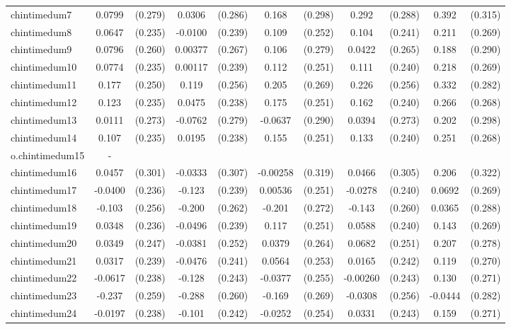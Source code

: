 \documentclass[]{article}
\begin{document}
\begin{tabular}{lcccccccccc}
chintimedum7 & 0.0799 & (0.279) & 0.0306 & (0.286) & 0.168 & (0.298) & 0.292 & (0.288) & 0.392 & (0.315) \\
chintimedum8 & 0.0647 & (0.235) & -0.0100 & (0.239) & 0.109 & (0.252) & 0.104 & (0.241) & 0.211 & (0.269) \\
chintimedum9 & 0.0796 & (0.260) & 0.00377 & (0.267) & 0.106 & (0.279) & 0.0422 & (0.265) & 0.188 & (0.290) \\
chintimedum10 & 0.0774 & (0.235) & 0.00117 & (0.239) & 0.112 & (0.251) & 0.111 & (0.240) & 0.218 & (0.269) \\
chintimedum11 & 0.177 & (0.250) & 0.119 & (0.256) & 0.205 & (0.269) & 0.226 & (0.256) & 0.332 & (0.282) \\
chintimedum12 & 0.123 & (0.235) & 0.0475 & (0.238) & 0.175 & (0.251) & 0.162 & (0.240) & 0.266 & (0.268) \\
chintimedum13 & 0.0111 & (0.273) & -0.0762 & (0.279) & -0.0637 & (0.290) & 0.0394 & (0.273) & 0.202 & (0.298) \\
chintimedum14 & 0.107 & (0.235) & 0.0195 & (0.238) & 0.155 & (0.251) & 0.133 & (0.240) & 0.251 & (0.268) \\
o.chintimedum15 & - &  &  &  &  &  &  &  &  &  \\
chintimedum16 & 0.0457 & (0.301) & -0.0333 & (0.307) & -0.00258 & (0.319) & 0.0466 & (0.305) & 0.206 & (0.322) \\
chintimedum17 & -0.0400 & (0.236) & -0.123 & (0.239) & 0.00536 & (0.251) & -0.0278 & (0.240) & 0.0692 & (0.269) \\
chintimedum18 & -0.103 & (0.256) & -0.200 & (0.262) & -0.201 & (0.272) & -0.143 & (0.260) & 0.0365 & (0.288) \\
chintimedum19 & 0.0348 & (0.236) & -0.0496 & (0.239) & 0.117 & (0.251) & 0.0588 & (0.240) & 0.143 & (0.269) \\
chintimedum20 & 0.0349 & (0.247) & -0.0381 & (0.252) & 0.0379 & (0.264) & 0.0682 & (0.251) & 0.207 & (0.278) \\
chintimedum21 & 0.0317 & (0.239) & -0.0476 & (0.241) & 0.0564 & (0.253) & 0.0165 & (0.242) & 0.119 & (0.270) \\
chintimedum22 & -0.0617 & (0.238) & -0.128 & (0.243) & -0.0377 & (0.255) & -0.00260 & (0.243) & 0.130 & (0.271) \\
chintimedum23 & -0.237 & (0.259) & -0.288 & (0.260) & -0.169 & (0.269) & -0.0308 & (0.256) & -0.0444 & (0.282) \\
chintimedum24 & -0.0197 & (0.238) & -0.101 & (0.242) & -0.0252 & (0.254) & 0.0331 & (0.243) & 0.159 & (0.271) \\

\end{tabular}
\end{document}
